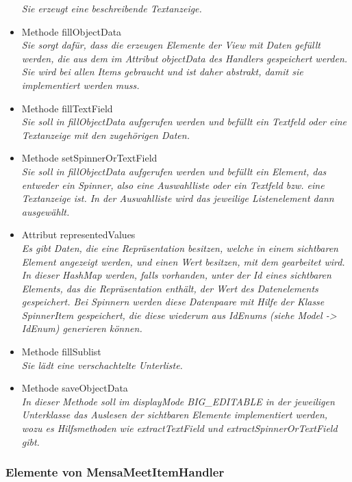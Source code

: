 \documentclass[a4paper]{scrreprt}
\begin{document}
\begin{itemize}
\textit{Sie erzeugt eine beschreibende Textanzeige.}
\item Methode fillObjectData\\
\textit{Sie sorgt dafür, dass die erzeugen Elemente der View mit Daten gefüllt werden, die aus dem im Attribut objectData des Handlers gespeichert werden. Sie wird bei allen Items gebraucht und ist daher abstrakt, damit sie implementiert werden muss.}
\item Methode fillTextField \\
\textit{Sie soll in fillObjectData aufgerufen werden und befüllt ein Textfeld oder eine Textanzeige mit den zugehörigen Daten. }
\item Methode setSpinnerOrTextField\\
\textit{Sie soll in fillObjectData aufgerufen werden und befüllt ein Element, das entweder ein Spinner, also eine Auswahlliste oder ein Textfeld bzw. eine Textanzeige ist. In der Auswahlliste wird das jeweilige Listenelement dann ausgewählt. }
\item Attribut representedValues\\
\textit{Es gibt Daten, die eine Repräsentation besitzen, welche in einem sichtbaren Element angezeigt werden, und einen Wert besitzen, mit dem gearbeitet wird. In dieser HashMap werden, falls vorhanden, unter der Id eines sichtbaren Elements, das die Repräsentation enthält, der Wert des Datenelements gespeichert. Bei Spinnern werden diese Datenpaare mit Hilfe der Klasse SpinnerItem gespeichert, die diese wiederum aus IdEnums (siehe Model -> IdEnum) generieren können.   }
\item Methode fillSublist \\
\textit{Sie lädt eine verschachtelte Unterliste.}
\item Methode saveObjectData\\
\textit{In dieser Methode soll im displayMode BIG\_EDITABLE in der jeweiligen Unterklasse das Auslesen der sichtbaren Elemente implementiert werden, wozu es Hilfsmethoden wie extractTextField und extractSpinnerOrTextField gibt.}

\end{itemize}

\subsubsection{Elemente von MensaMeetItemHandler}
\end{document}
